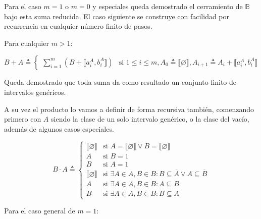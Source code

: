 \begin{enumerate}
Para el caso $m = 1$ o $m = 0$ y especiales queda demostrado el cerramiento de $\mathbb{B}$ bajo esta suma reducida. 
El caso siguiente se construye con facilidad por recurrencia en cualquier número finito de pasos. 

Para cualquier $m > 1:$

\[
B + A \triangleq \begin{cases}
  \sum_{i=1}^{m} \left( B + \llbracket a_i^A, b_i^A \rrbracket \right) & \text{si } 1 \le i \le m, A_0 \triangleq \llbracket \varnothing \rrbracket, A_{i+1} \triangleq A_i + \llbracket a_i^A, b_i^A \rrbracket
\end{cases}
\]

Queda demostrado que toda suma da como resultado un conjunto finito de intervalos genéricos.

A su vez el producto lo vamos a definir de forma recursiva también, comenzando primero con $A$ siendo la clase de un solo intervalo genérico, o la clase del vacío, además de algunos casos especiales.

\[
B \cdot A \triangleq \begin{cases}
  \llbracket \varnothing \rrbracket & \text{si } A = \llbracket \varnothing \rrbracket \lor B = \llbracket \varnothing \rrbracket \\
  A & \text{si } B = 1 \\
  B & \text{si } A = 1 \\
  \llbracket \varnothing \rrbracket & \text{si } \exists A \in A, B \in B : B \subseteq \overline{A} \lor A \subseteq \overline{B} \\
  A & \text{si } \exists A \in A, B \in B : A \subseteq B \\
  B & \text{si } \exists A \in A, B \in B : B \subseteq A
\end{cases}
\]

Para el caso general de $m = 1:$


\end{enumerate}
